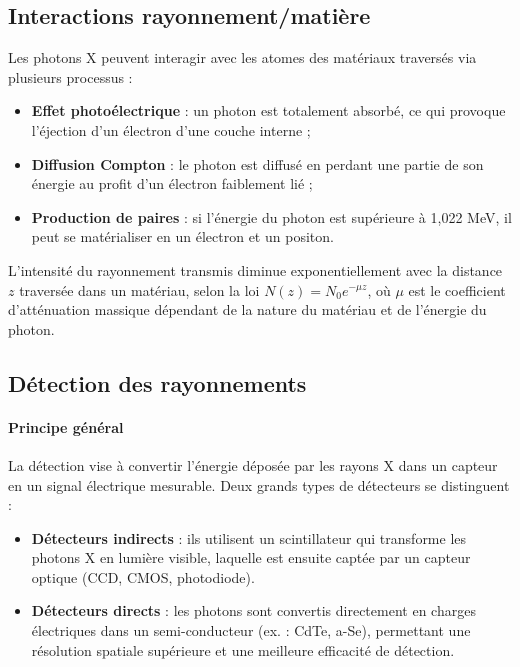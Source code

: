 \documentclass[12pt,a4paper]{report}
\begin{document}
\subsection{Interactions rayonnement/matière}
Les photons X peuvent interagir avec les atomes des matériaux traversés via plusieurs processus :
\begin{itemize}
\item \textbf{Effet photoélectrique} : un photon est totalement absorbé, ce qui provoque l’éjection d’un électron d’une couche interne ;
\item \textbf{Diffusion Compton} : le photon est diffusé en perdant une partie de son énergie au profit d’un électron faiblement lié ;
\item \textbf{Production de paires} : si l’énergie du photon est supérieure à 1,022 MeV, il peut se matérialiser en un électron et un positon.
\end{itemize}
L’intensité du rayonnement transmis diminue exponentiellement avec la distance $z$ traversée dans un matériau, selon la loi $N(z) = N_0 e^{-\mu z}$, où $\mu$ est le coefficient d’atténuation massique dépendant de la nature du matériau et de l’énergie du photon.

\subsection{Détection des rayonnements}
\paragraph{Principe général} La détection vise à convertir l’énergie déposée par les rayons X dans un capteur en un signal électrique mesurable. Deux grands types de détecteurs se distinguent :
\begin{itemize}
\item \textbf{Détecteurs indirects} : ils utilisent un scintillateur qui transforme les photons X en lumière visible, laquelle est ensuite captée par un capteur optique (CCD, CMOS, photodiode).
\item \textbf{Détecteurs directs} : les photons sont convertis directement en charges électriques dans un semi-conducteur (ex. : CdTe, a-Se), permettant une résolution spatiale supérieure et une meilleure efficacité de détection.
\end{itemize}
\end{document}
